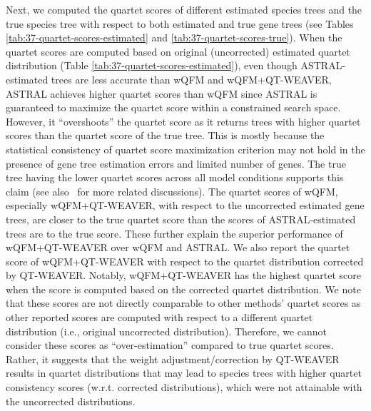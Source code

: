 \documentclass[10pt,a4paper]{article}
\begin{document}
Next, we computed the quartet scores of different estimated species trees and the true species tree with respect to both estimated and true gene trees (see Tables \ref{tab:37-quartet-scores-estimated} and \ref{tab:37-quartet-scores-true}). When the quartet scores are computed based on original (uncorrected) estimated quartet distribution (Table \ref{tab:37-quartet-scores-estimated}), even though ASTRAL-estimated trees are less accurate than wQFM and wQFM+QT-WEAVER, ASTRAL achieves higher quartet scores than wQFM since ASTRAL is guaranteed to maximize the quartet score within a constrained search space. However, it ``overshoots'' the quartet score as it returns trees with higher quartet scores than the quartet score of the true tree. %
This is mostly because the statistical consistency of quartet score maximization criterion may not hold in the presence of gene tree estimation errors and limited number of genes.
The true tree having the lower quartet scores across all model conditions supports this claim (see also~\cite{spterrace,farah2020phylogenomic,hasan2024leveraging} for more related discussions). %
The quartet scores of wQFM, especially wQFM+QT-WEAVER, with respect to the uncorrected estimated gene trees, are closer to the true quartet score than the scores of ASTRAL-estimated trees are to the true score. These further explain the superior performance of wQFM+QT-WEAVER over wQFM and ASTRAL. We also report the quartet score of wQFM+QT-WEAVER with respect to the quartet distribution corrected by QT-WEAVER. Notably, wQFM+QT-WEAVER has the highest quartet score when the score is computed based on the corrected quartet distribution. We note that these scores are not directly comparable to other methods' quartet scores as other reported scores are computed with respect to a different quartet distribution (i.e., original uncorrected distribution). Therefore, we cannot consider these scores as ``over-estimation'' compared to true quartet scores. Rather, it suggests that the weight adjustment/correction by QT-WEAVER results in quartet distributions that may lead to species trees with higher quartet consistency scores (w.r.t. corrected distributions), which were not attainable with the uncorrected distributions.
\end{document}
